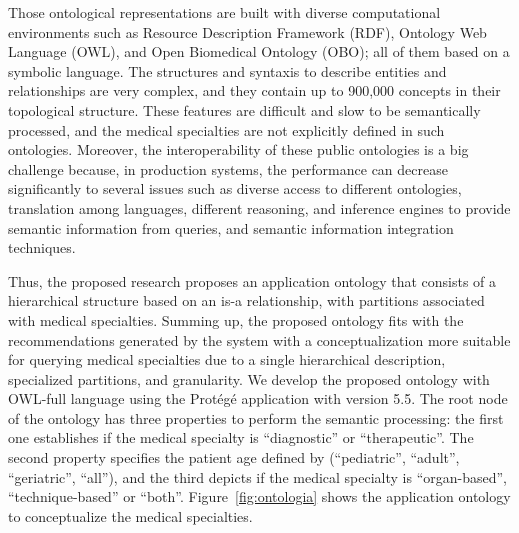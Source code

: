 \documentclass[sustainability,article,submit,pdftex,moreauthors]{Definitions/mdpi}
\begin{document}
Those ontological representations are built with diverse computational environments such as Resource Description Framework (RDF), Ontology Web Language (OWL), and Open Biomedical Ontology (OBO); all of them based on a symbolic language. The structures and syntaxis to describe entities and relationships are very complex, and they contain up to 900,000 concepts in their topological structure. These features are difficult and slow to be semantically processed, and the medical specialties are not explicitly defined in such ontologies. Moreover, the interoperability of these public ontologies is a big challenge because, in production systems, the performance can decrease significantly to several issues such as diverse access to different ontologies, translation among languages, different reasoning, and inference engines to provide semantic information from queries, and semantic information integration techniques.

Thus, the proposed research proposes an application ontology that consists of a hierarchical structure based on an is-a relationship, with partitions associated with medical specialties. Summing up, the proposed ontology fits with the recommendations generated by the system with a conceptualization more suitable for querying medical specialties due to a single hierarchical description, specialized partitions, and granularity. We develop the proposed ontology with OWL-full language using the Protégé application with version 5.5. The root node of the ontology has three properties to perform the semantic processing: the first one establishes if the medical specialty is “diagnostic” or “therapeutic”. The second property specifies the patient age defined by (“pediatric”, “adult”, “geriatric”, “all”), and the third depicts if the medical specialty is “organ-based”, “technique-based” or “both”. Figure~\ref{fig:ontologia} shows the application ontology to conceptualize the medical specialties.
\end{document}
